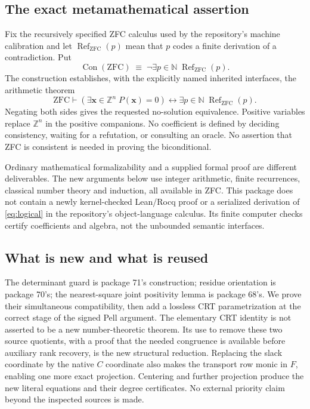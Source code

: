 \documentclass[11pt]{article}
\theoremstyle{remark}\newtheorem{remark}[theorem]{Remark}
\newcommand{\Z}{\mathbb Z}
\newcommand{\N}{\mathbb N}
\newcommand{\Con}{\operatorname{Con}}
\newcommand{\Refute}{\operatorname{Ref}}
\begin{document}
\subsection{The exact metamathematical assertion}
Fix the recursively specified ZFC calculus used by the repository's
machine calibration and let $\Refute_{\mathrm{ZFC}}(p)$ mean that $p$ codes
a finite derivation of a contradiction. Put
\[
 \Con(\mathrm{ZFC})\;\equiv\;\neg\exists p\in\N\;\Refute_{\mathrm{ZFC}}(p).
\]
The construction establishes, with the explicitly named inherited
interfaces, the arithmetic theorem
\begin{equation}
 \mathrm{ZFC}\vdash
 \left(\exists\boldsymbol x\in\Z^n\;P(\boldsymbol x)=0\right)
 \longleftrightarrow
 \exists p\in\N\;\Refute_{\mathrm{ZFC}}(p).       \label{eq:logical}
\end{equation}
Negating both sides gives the requested no-solution equivalence. Positive
variables replace $\Z^n$ in the positive companions. No coefficient is
defined by deciding consistency, waiting for a refutation, or consulting
an oracle. No assertion that ZFC is consistent is needed in proving the
biconditional.

Ordinary mathematical formalizability and a supplied formal proof are
different deliverables. The new arguments below use integer arithmetic,
finite recurrences, classical number theory and induction, all available
in ZFC. This package does not contain a newly kernel-checked Lean/Rocq
proof or a serialized derivation of \eqref{eq:logical} in the
repository's object-language calculus. Its finite computer checks
certify coefficients and algebra, not the unbounded semantic interfaces.

\subsection{What is new and what is reused}
The determinant guard is package 71's construction; residue orientation
is package 70's; the nearest-square joint positivity lemma is package
68's. We prove their simultaneous compatibility, then add a lossless
CRT parametrization at the correct stage of the signed Pell argument.
The elementary CRT identity is not asserted to be a new number-theoretic
theorem. Its use to remove these two source quotients, with a proof that
the needed congruence is available before auxiliary rank recovery, is
the new structural reduction. Replacing the slack coordinate by the
native $C$ coordinate also makes the transport row monic in $F$, enabling
one more exact projection. Centering and further projection produce
the new literal equations and their degree certificates. No external
priority claim beyond the inspected sources is made.
\end{document}
